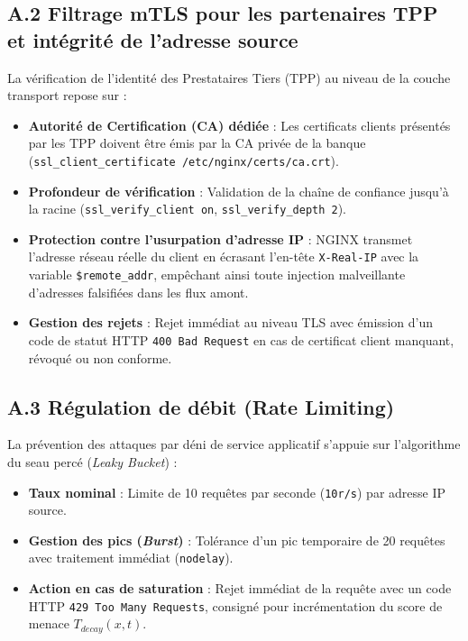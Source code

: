 \subsection*{A.2 Filtrage mTLS pour les partenaires TPP et intégrité de l'adresse source}
La vérification de l'identité des Prestataires Tiers (TPP) au niveau de la couche transport repose sur :
\begin{itemize}[leftmargin=*]
    \item \textbf{Autorité de Certification (CA) dédiée} : Les certificats clients présentés par les TPP doivent être émis par la CA privée de la banque (\texttt{ssl\_client\_certificate /etc/nginx/certs/ca.crt}).
    \item \textbf{Profondeur de vérification} : Validation de la chaîne de confiance jusqu'à la racine (\texttt{ssl\_verify\_client on}, \texttt{ssl\_verify\_depth 2}).
    \item \textbf{Protection contre l'usurpation d'adresse IP} : NGINX transmet l'adresse réseau réelle du client en écrasant l'en-tête \texttt{X-Real-IP} avec la variable \texttt{\$remote\_addr}, empêchant ainsi toute injection malveillante d'adresses falsifiées dans les flux amont.
    \item \textbf{Gestion des rejets} : Rejet immédiat au niveau TLS avec émission d'un code de statut HTTP \texttt{400 Bad Request} en cas de certificat client manquant, révoqué ou non conforme.
\end{itemize}

\subsection*{A.3 Régulation de débit (Rate Limiting)}
La prévention des attaques par déni de service applicatif s'appuie sur l'algorithme du seau percé (\textit{Leaky Bucket}) :
\begin{itemize}[leftmargin=*]
    \item \textbf{Taux nominal} : Limite de 10 requêtes par seconde (\texttt{10r/s}) par adresse IP source.
    \item \textbf{Gestion des pics (\textit{Burst})} : Tolérance d'un pic temporaire de 20 requêtes avec traitement immédiat (\texttt{nodelay}).
    \item \textbf{Action en cas de saturation} : Rejet immédiat de la requête avec un code HTTP \texttt{429 Too Many Requests}, consigné pour incrémentation du score de menace $T_{decay}(x,t)$.
\end{itemize}

